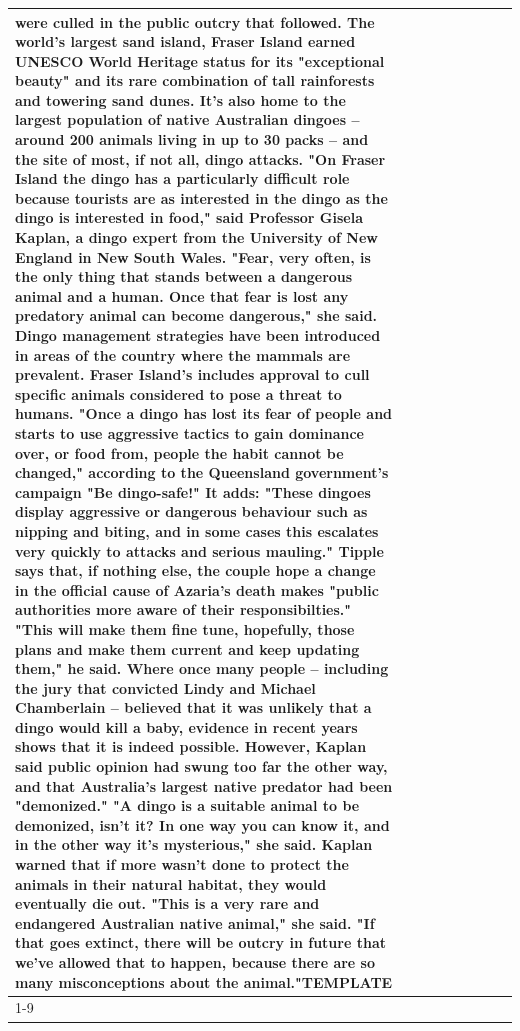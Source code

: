 \begin{table}[H]
\begin{tabular}{lllrlllll}
were culled in the public outcry that followed. The world's largest sand island, Fraser Island earned UNESCO World Heritage status for its "exceptional beauty" and its rare combination of tall rainforests and towering sand dunes. It's also home to the largest population of native Australian dingoes -- around 200 animals living in up to 30 packs -- and the site of most, if not all, dingo attacks. "On Fraser Island the dingo has a particularly difficult role because tourists are as interested in the dingo as the dingo is interested in food," said Professor Gisela Kaplan, a dingo expert from the University of New England in New South Wales. "Fear, very often, is the only thing that stands between a dangerous animal and a human. Once that fear is lost any predatory animal can become dangerous," she said. Dingo management strategies have been introduced in areas of the country where the mammals are prevalent. Fraser Island's includes approval to cull specific animals considered to pose a threat to humans. "Once a dingo has lost its fear of people and starts to use aggressive tactics to gain dominance over, or food from, people the habit cannot be changed," according to the Queensland government's campaign "Be dingo-safe!" It adds: "These dingoes display aggressive or dangerous behaviour such as nipping and biting, and in some cases this escalates very quickly to attacks and serious mauling." Tipple says that, if nothing else, the couple hope a change in the official cause of Azaria's death makes "public authorities more aware of their responsibilties." "This will make them fine tune, hopefully, those plans and make them current and keep updating them," he said. Where once many people -- including the jury that convicted Lindy and Michael Chamberlain -- believed that it was unlikely that a dingo would kill a baby, evidence in recent years shows that it is indeed possible. However, Kaplan said public opinion had swung too far the other way, and that Australia's largest native predator had been "demonized." "A dingo is a suitable animal to be demonized, isn't it? In one way you can know it, and in the other way it's mysterious," she said. Kaplan warned that if more wasn't done to protect the animals in their natural habitat, they would eventually die out. "This is a very rare and endangered Australian native animal," she said. "If that goes extinct, there will be outcry in future that we've allowed that to happen, because there are so many misconceptions about the animal."TEMPLATE \\
\cline{1-9}

\end{tabular}
\end{table}
